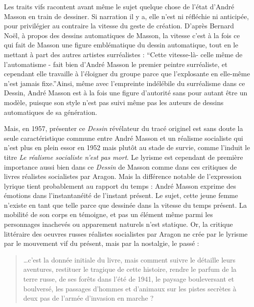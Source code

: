 	Les traits vifs racontent avant même le sujet quelque chose de l’état d’André Masson en train de dessiner. Si narration il y a, elle n’est ni réfléchie ni anticipée, pour privilégier au contraire la vitesse du geste de création. D’après Bernard Noël, à propos des dessins automatiques de Masson, la vitesse c’est à la fois ce qui fait de Masson une figure emblématique du dessin automatique, tout en le mettant à part des autres artistes surréalistes : \enquote{Cette vitesse-là- celle même de l’automatisme - fait bien d’André Masson le premier peintre surréaliste, et cependant elle travaille à l’éloigner du groupe parce que l’explosante en elle-même n’est jamais fixe.}Ainsi, même avec l’empreinte indélébile du surréalisme dans ce Dessin, André Masson est à la fois une figure d’autorité sans pour autant être un modèle, puisque son style n’est pas suivi même pas les auteurs de dessins automatiques de sa génération. 

	Mais, en 1957, présenter ce \emph{Dessin} révélateur du tracé originel est sans doute la seule caractéristique commune entre André Masson et un réalisme socialiste qui n’est plus en plein essor en 1952 mais plutôt au stade de survie, comme l’induit le titre \emph{Le réalisme socialiste n’est pas mort}. Le lyrisme est cependant de première importance aussi bien dans ce \emph{Dessin} de Masson comme dans ces critiques de livres réalistes socialistes par Aragon. Mais la différence notable de l’expression lyrique tient probablement au rapport du temps : André Masson exprime des émotions dans l’instantanéité de l’instant présent. Le sujet, cette jeune femme n’existe en tant que telle parce que dessinée dans la vitesse du temps présent. La mobilité de son corps en témoigne, et pas un élément même parmi les personnages inachevés ou apparement naturels n’est statique. Or, la critique littéraire des oeuvres russes réalistes socialistes par Aragon ne crée par le lyrisme par le mouvement vif du présent, mais par la nostalgie, le passé : 

\begin{quote}
…c’est la donnée initiale du livre, mais comment suivre le détaille leurs aventures, restituer le tragique de cette histoire, rendre le parfum de la terre russe, de ses forêts dans l’été de 1941, le paysage bouleversant et boulversé, les passages d’hommes et d’animaux sur les pistes secrètes à deux pas de l’armée d’invasion en marche ?  	
\end{quote}	


